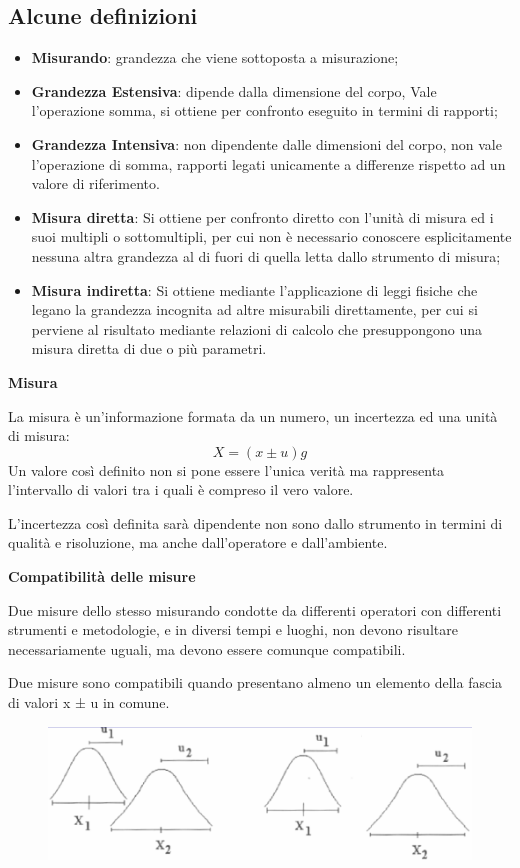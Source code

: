 \documentclass[a4paper, 15pt]{article}
\begin{document}
\subsection{Alcune definizioni} 		
	\begin{adjustwidth}{2in}{}
		\begin{itemize}
		\item \textbf{Misurando}: grandezza che viene sottoposta a misurazione;
		\item \textbf{Grandezza Estensiva}: dipende dalla dimensione del corpo, Vale l’operazione somma, si ottiene per confronto eseguito in termini di rapporti;
		\item \textbf{Grandezza Intensiva}: non dipendente dalle dimensioni del corpo, non vale l'operazione di somma, rapporti legati unicamente a differenze rispetto ad un valore di riferimento.
		\item \textbf{Misura diretta}: Si ottiene per confronto diretto con l'unità di misura ed i suoi multipli o sottomultipli, per cui non è necessario conoscere esplicitamente nessuna altra grandezza al di fuori di quella letta dallo strumento di misura;
		\item \textbf{Misura indiretta}: Si ottiene mediante l'applicazione di leggi fisiche che legano la grandezza incognita ad altre misurabili direttamente, per cui si perviene al risultato mediante relazioni di calcolo che presuppongono una
		misura diretta di due o più parametri.
	\end{itemize}
	
\textbf{Misura} 

	La misura è un'informazione formata da un numero, un incertezza ed una unità di misura:
	\[ X= (x \pm u)g \]
	Un valore così definito non si pone essere l'unica verità ma rappresenta l'intervallo di valori tra i quali è compreso il vero valore. 
	
	L'incertezza così definita sarà dipendente non sono dallo strumento in termini di qualità e risoluzione, ma anche dall'operatore e dall'ambiente. 
	
\textbf{Compatibilità delle misure} 

	Due misure dello stesso misurando condotte da differenti operatori con
	differenti strumenti e metodologie, e in diversi tempi e luoghi, non devono
	risultare necessariamente uguali, ma devono essere comunque compatibili.
	
	Due misure sono compatibili quando presentano almeno un elemento della
	fascia di valori x ± u in comune.
	
\begin{figure}[H]
	\centering
	\includegraphics[width=0.5\linewidth]{fig/screenshot001}
	\label{fig:screenshot001}
\end{figure}
\end{adjustwidth}
\end{document}
